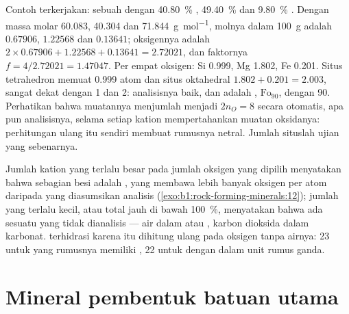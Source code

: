 Contoh terkerjakan: sebuah  dengan \qty{40.80}{\percent} , \qty{49.40}{\percent}  dan \qty{9.80}{\percent} . Dengan massa molar \num{60.083}, \num{40.304} dan \qty{71.844}{g.mol^{-1}}, molnya dalam \qty{100}{g} adalah $0.67906$, $1.22568$ dan $0.13641$; oksigennya adalah $2\times0.67906 + 1.22568 + 0.13641 = 2.72021$, dan faktornya $f = 4/2.72021 = 1.47047$. Per empat oksigen: Si \num{0.999}, Mg \num{1.802}, Fe \num{0.201}. Situs tetrahedron memuat \num{0.999} atom dan situs oktahedral $1.802 + 0.201 = 2.003$, sangat dekat dengan 1 dan 2: analisisnya baik, dan  adalah , $\text{Fo}_{90}$, dengan  90. Perhatikan bahwa muatannya menjumlah menjadi $2n_O = 8$ secara otomatis, apa pun analisisnya, selama setiap kation mempertahankan muatan oksidanya: perhitungan ulang itu sendiri membuat rumusnya netral. Jumlah situslah ujian yang sebenarnya.

Jumlah kation yang terlalu besar pada jumlah oksigen yang dipilih menyatakan bahwa sebagian besi adalah , yang membawa lebih banyak oksigen per atom daripada yang diasumsikan analisis (\cref{exo:b1:rock-forming-minerals:12}); jumlah yang terlalu kecil, atau total jauh di bawah \qty{100}{\percent}, menyatakan bahwa ada sesuatu yang tidak dianalisis --- air dalam  atau , karbon dioksida dalam karbonat.  terhidrasi karena itu dihitung ulang pada oksigen tanpa airnya: 23 untuk  yang rumusnya memiliki , 22 untuk  dengan  dalam unit rumus ganda.

\section{Mineral pembentuk batuan utama}

